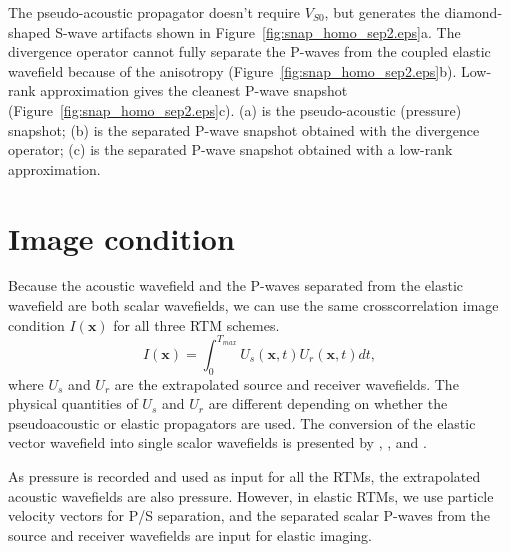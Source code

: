 \documentclass[manuscript,ulem,graphix,revised]{geophysics}
\begin{document}
The pseudo-acoustic propagator doesn't require $V_{S0}$, but generates the diamond-shaped S-wave artifacts \citep{alkhalifah00,grechka04} shown in Figure~\ref{fig:snap_homo_sep2.eps}a. The divergence operator cannot fully separate the P-waves from the coupled elastic wavefield because of the anisotropy (Figure~\ref{fig:snap_homo_sep2.eps}b). Low-rank approximation gives the cleanest P-wave snapshot (Figure~\ref{fig:snap_homo_sep2.eps}c). 
{
(a) is the pseudo-acoustic (pressure) snapshot; (b) is the separated P-wave snapshot obtained with the divergence operator; (c) is the separated P-wave snapshot obtained with a low-rank approximation.
}

\section{Image condition}
\indent\indent
Because the acoustic wavefield and the P-waves separated from the elastic wavefield are both scalar wavefields, we can use the same crosscorrelation image condition $I(\boldsymbol{x})$ for all three RTM schemes.
\begin{equation}
I(\boldsymbol{x})=\int_{0}^{T_{max}}U_s(\boldsymbol{x},t)U_r(\boldsymbol{x},t)dt,
\label{eqn:image_cdt}
\end{equation}
where $U_s$ and $U_r$ are the extrapolated source and receiver wavefields. The physical quantities of $U_s$ and $U_r$ are different depending on whether the pseudoacoustic or elastic propagators are used. The conversion of the elastic vector wavefield into single scalor wavefields is presented by \citet{sun06}, \citep{wenlong15b},\citep{ting16} and \citep{tang17}. 

As pressure is recorded and used as input for all the RTMs, the extrapolated acoustic wavefields are also pressure. However, in elastic RTMs, we use particle velocity vectors for P/S separation, and the separated scalar P-waves from the source and receiver wavefields are input for elastic imaging. 
\end{document}
